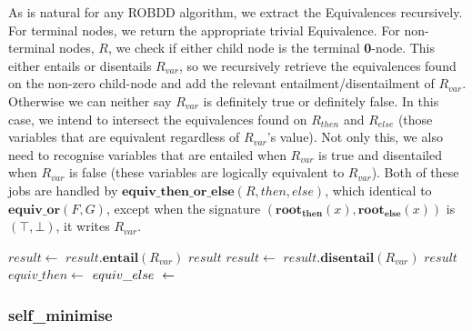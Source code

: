 \documentclass[11pt,table]{article}
\newcounter{r}
\newcommand{\func}[2]{\mathbf{#1}(#2)}
\begin{document}
As is natural for any ROBDD algorithm, we extract the Equivalences recursively. For terminal nodes, we return the appropriate trivial Equivalence. For non-terminal nodes, $ R $, we check if either child node is the terminal \textbf{0}-node. This either entails or disentails $ R_{var} $, so we recursively retrieve the equivalences found on the non-zero child-node and add the relevant entailment/disentailment of $ R_{var} $. Otherwise we can neither say $ R_{var} $ is definitely true or definitely false. In this case, we intend to intersect the equivalences found on $ R_{then} $ and $ R_{else} $ (those variables that are equivalent regardless of $ R_{var} $'s value). Not only this, we also need to recognise variables that are entailed when $ R_{var} $ is true and disentailed when $ R_{var} $ is false (these variables are logically equivalent to $ R_{var} $). Both of these jobs are handled by $ \func{equiv\_then\_or\_else}{R, then, else} $, which identical to $ \func{equiv\_or}{F,G} $, except when the signature $ (\func{root_{then}}{x}, \func{root_{else}}{x}) $ is $ (\top, \bot) $, it writes $ R_{var} $.

\begin{algorithm}
	\begin{algorithmic}[1]
				\Return {}
				\Return {}
			\EndIf
		\Else
			
				\State $ result \gets  $ 
				\State $ result.\func{entail}{R_{var}} $
				\State \Return $ result $
				\State $ result \gets $ 
				\State $ result.\func{disentail}{R_{var}} $
				\State \Return $ result $
			\Else
				\State $ equiv\_then \gets $ 
				\State $ equiv\_else \hspace{3.5pt} \gets $ 
				\State \Return {}
			\EndIf
		\EndIf
		
		\EndFunction
	\end{algorithmic}
\end{algorithm}

\subsubsection{self\_minimise}
\end{document}
